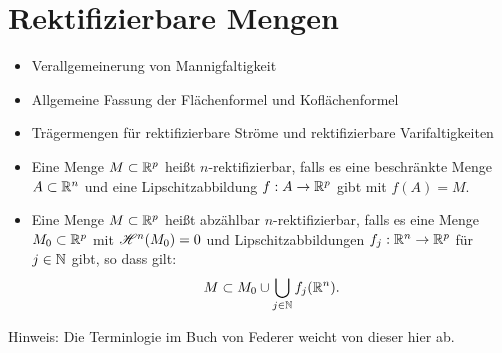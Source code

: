 \documentclass[a4paper,twoside,DIV15,BCOR12mm]{scrbook}
\newcommand{\HM}{\H}
\begin{document}
\section{Rektifizierbare Mengen}

\begin{motivation}
\begin{itemize}
\item Verallgemeinerung von Mannigfaltigkeit
\item Allgemeine Fassung der Flächenformel und Koflächenformel
\item Trägermengen für rektifizierbare Ströme und rektifizierbare Varifaltigkeiten
\end{itemize}
\end{motivation}

\begin{definition}
\begin{itemize}
\item Eine Menge $M\subset \mathbb{R}^p$ heißt $n$-rektifizierbar, falls es eine beschränkte Menge $A\subset\mathbb{R}^n$ und eine Lipschitzabbildung $f:A\to\mathbb{R}^p$ gibt mit $f(A)=M$. 
\item 
Eine Menge $M\subset \mathbb{R}^p$ heißt abzählbar $n$-rektifizierbar, falls es eine Menge $M_0\subset \mathbb{R}^p$ mit $\HM^n(M_0)=0$ und Lipschitzabbildungen $f_j:\mathbb{R}^n \to \mathbb{R}^p$ für $j\in \mathbb{N}$ gibt, so dass gilt:
\[
M \subset M_0 \cup \bigcup_{j\in\mathbb{N}} f_j(\mathbb{R}^n).
\]
\end{itemize}
\end{definition}

Hinweis: Die Terminlogie im Buch von Federer weicht von dieser hier ab.
\end{document}
